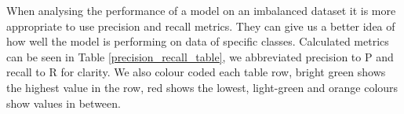 When analysing the performance of a model on an imbalanced dataset it is more appropriate to use precision and recall metrics\footnotemark.
They can give us a better idea of how well the model is performing on data of specific classes.
Calculated metrics can be seen in Table \ref{precision_recall_table}, we abbreviated precision to P and recall to R for clarity.
We also colour coded each table row, bright green shows the highest value in the row, red shows the lowest, light-green and orange colours show values in between.
\begin{table}[ht]
    \caption{ Precision and recall metrics of trained models}
\end{table}
